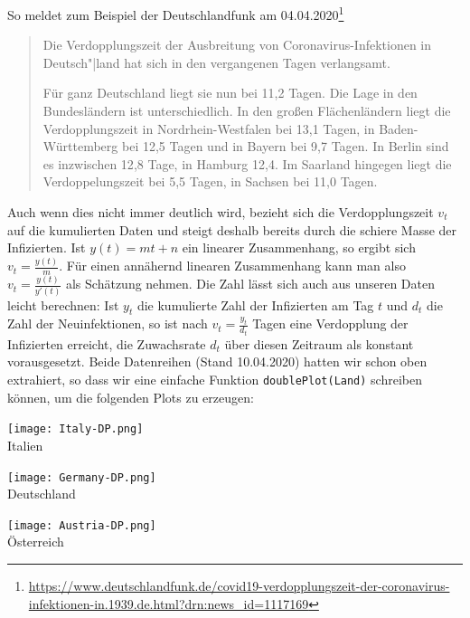 \documentclass[a4paper,11pt]{article}
\begin{document}
So meldet zum Beispiel der Deutschlandfunk am 04.04.2020\footnote{\raggedright
  \url{https://www.deutschlandfunk.de/covid19-verdopplungszeit-der-coronavirus-infektionen-in.1939.de.html?drn:news_id=1117169}}
\begin{quote}
  Die Verdopplungszeit der Ausbreitung von Coronavirus-Infektionen in
  Deutsch"|land hat sich in den vergangenen Tagen verlangsamt.

  Für ganz Deutschland liegt sie nun bei 11{,}2 Tagen. Die Lage in den
  Bundesländern ist unterschiedlich. In den großen Flächenländern liegt die
  Verdopplungszeit in Nordrhein-Westfalen bei 13{,}1 Tagen, in
  Baden-Württemberg bei 12{,}5 Tagen und in Bayern bei 9{,}7 Tagen. In Berlin
  sind es inzwischen 12{,}8 Tage, in Hamburg 12{,}4. Im Saarland hingegen
  liegt die Verdoppelungszeit bei 5{,}5 Tagen, in Sachsen bei 11{,}0 Tagen.
\end{quote}
Auch wenn dies nicht immer deutlich wird, bezieht sich die Verdopplungszeit
$v_t$ auf die kumulierten Daten und steigt deshalb bereits durch die schiere
Masse der Infizierten.  Ist $y(t)=mt+n$ ein linearer Zusammenhang, so ergibt
sich $v_t=\frac{y(t)}{m}$. Für einen annähernd linearen Zusammenhang kann man
also $v_t=\frac{y(t)}{y'(t)}$ als Schätzung nehmen.  Die Zahl lässt sich auch
aus unseren Daten leicht berechnen: Ist $y_t$ die kumulierte Zahl der
Infizierten am Tag $t$ und $d_t$ die Zahl der Neuinfektionen, so ist nach
$v_t=\frac{y_t}{d_t}$ Tagen eine Verdopplung der Infizierten erreicht, die
Zuwachsrate $d_t$ über diesen Zeitraum als konstant vorausgesetzt.  Beide
Datenreihen (Stand 10.04.2020) hatten wir schon oben extrahiert, so dass wir
eine einfache Funktion \texttt{doublePlot(Land)} schreiben können, um die
folgenden Plots zu erzeugen:
\begin{center}  
  \begin{minipage}{.33\textwidth}\centering
    \texttt{[image: Italy-DP.png]}\\[1em] {Italien}
  \end{minipage}\hfill
  \begin{minipage}{.33\textwidth}\centering
    \texttt{[image: Germany-DP.png]}\\[1em] {Deutschland}
  \end{minipage}\hfill
  \begin{minipage}{.33\textwidth}\centering
    \texttt{[image: Austria-DP.png]}\\[1em] {Österreich}
  \end{minipage}
\end{center}
\end{document}
